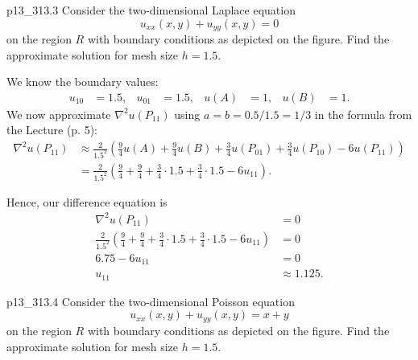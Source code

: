 \begin{problemwithimage}{p13_3}{13.3}
  Consider the two-dimensional Laplace equation
  \begin{equation*}
    u_{x x}(x,y) + u_{yy}(x,y) = 0
  \end{equation*}
  on the region $R$ with boundary conditions as depicted on the figure.
  Find the approximate solution for mesh size $h = \num{1,5}$.
\end{problemwithimage}

\begin{derivation}
  We know the boundary values:
  \begin{align*}
    u_{10} &= \num{1,5}, & u_{01} &= \num{1,5}, & u(A) &= 1, & u(B) &= 1
  .\end{align*}
  We now approximate $\nabla^2 u (P_{11})$ using $a = b = \num{0,5} / \num{1,5}  = 1 / 3$ in the formula from the Lecture (p. 5):
  \begin{align*}
    \nabla^2u(P_{11}) &\approx \frac{2}{\num{1,5}^2} \left( \frac{9}{4}u(A) + \frac{9}{4}u(B) + \frac{3}{4}u(P_{01}) + \frac{3}{4} u(P_{10}) - 6u (P_{11}) \right) \\
    &= \frac{2}{\num{1,5}^2} \left( \frac{9}{4} + \frac{9}{4} + \frac{3}{4} \cdot \num{1,5}  + \frac{3}{4}\cdot \num{1,5} - 6u_{11} \right)
  .\end{align*}

  Hence, our difference equation is
  \begin{align*}
    \nabla^2 u(P_{11}) &= 0 \\
    \frac{2}{\num{1,5}^2} \left( \frac{9}{4} + \frac{9}{4} + \frac{3}{4} \cdot \num{1,5}  + \frac{3}{4}\cdot \num{1,5} - 6u_{11} \right) &= 0 \\
    \num{6,75}  - 6 u_{11} &= 0 \\
    u_{11} &\approx \num{1,125} 
  .\end{align*}
\end{derivation}


\begin{problemwithimage}{p13_3}{13.4}
  Consider the two-dimensional Poisson equation
  \begin{equation*}
    u_{x x}(x,y) + u_{yy}(x,y) = x + y
  \end{equation*}
  on the region $R$ with boundary conditions as depicted on the figure.
  Find the approximate solution for mesh size $h = \num{1,5}$.
\end{problemwithimage}

